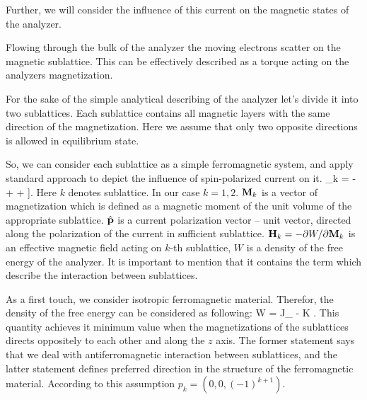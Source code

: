 Further, we will consider the influence of this current on the magnetic states of the analyzer.

Flowing through the bulk of the analyzer the moving electrons scatter on the magnetic sublattice. This can be effectively described as a torque acting on the analyzers magnetization.

For the sake of the simple analytical describing of the analyzer let's divide it into two sublattices. Each sublattice contains all magnetic layers with the same direction of the magnetization. Here we assume that only two opposite directions is allowed in equilibrium state.

So, we can consider each sublattice as a simple ferromagnetic system, and apply standard approach to depict the influence of spin-polarized current on it.
\be
	\label{eq:LLGS}
	_k =
			- \gamma {}
			+ 
			+ 
				\left[
					\mb{M}_k \times \left[ \mb{M}_k \times \uv{p}_k \right]
				\right].
\ee
Here $k$ denotes sublattice. In our case $k = 1, 2$. $\mathbf{ {M} }_k$ is a vector of magnetization which is defined as a magnetic moment of the unit volume of the appropriate sublattice. $\hat{\mathbf{ { p } }}$ is a current polarization vector -- unit vector, directed along the polarization of the current in sufficient sublattice. $\mathbf{ {H} }_k = -\partial W / \partial \mathbf{ {M} }_k$ is an effective magnetic field acting on $k$-th sublattice, $W$ is a density of the free energy of the analyzer. It is important to mention that it contains the term which describe the interaction between sublattices.

As a first touch, we consider isotropic ferromagnetic material. Therefor, the density of the free energy can be considered as following:
\be
	\label{eq:free_enegy}
	W = J_ 
		-  K .
\ee
This quantity achieves it minimum value when the magnetizations of the sublattices directs oppositely to each other and along the $z$ axis. The former statement says that we deal with antiferromagnetic interaction between sublattices, and the latter statement defines preferred direction in the structure of the ferromagnetic material. According to this assumption $p_k = (0, 0, (-1)^{k+1})$.














